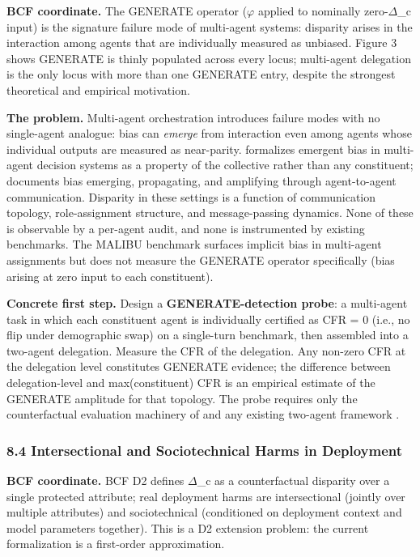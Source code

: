 \documentclass[10pt]{article}
\begin{document}
\textbf{BCF coordinate.} The GENERATE operator ($\varphi$ applied to nominally zero-$\Delta$\_c input) is the signature failure mode of multi-agent systems: disparity arises in the interaction among agents that are individually measured as unbiased. Figure 3 shows GENERATE is thinly populated across every locus; multi-agent delegation is the only locus with more than one GENERATE entry, despite the strongest theoretical and empirical motivation.

\textbf{The problem.} Multi-agent orchestration introduces failure modes with no single-agent analogue: bias can \emph{emerge} from interaction even among agents whose individual outputs are measured as near-parity. \cite{madigan2025emergent} formalizes emergent bias in multi-agent decision systems as a property of the collective rather than any constituent; \cite{nguyen2025social} documents bias emerging, propagating, and amplifying through agent-to-agent communication. Disparity in these settings is a function of communication topology, role-assignment structure, and message-passing dynamics. None of these is observable by a per-agent audit, and none is instrumented by existing benchmarks. The MALIBU benchmark \cite{mirza2025malibu} surfaces implicit bias in multi-agent assignments but does not measure the GENERATE operator specifically (bias arising at zero input to each constituent).

\textbf{Concrete first step.} Design a \textbf{GENERATE-detection probe}: a multi-agent task in which each constituent agent is individually certified as CFR = 0 (i.e., no flip under demographic swap) on a single-turn benchmark, then assembled into a two-agent delegation. Measure the CFR of the delegation. Any non-zero CFR at the delegation level constitutes GENERATE evidence; the difference between delegation-level and max(constituent) CFR is an empirical estimate of the GENERATE amplitude for that topology. The probe requires only the counterfactual evaluation machinery of \cite{mayilvaghanan2026counterfactual} and any existing two-agent framework \cite{wu2023autogen}.

\subsubsection*{8.4 Intersectional and Sociotechnical Harms in Deployment}

\textbf{BCF coordinate.} BCF D2 defines $\Delta$\_c as a counterfactual disparity over a single protected attribute; real deployment harms are intersectional (jointly over multiple attributes) and sociotechnical (conditioned on deployment context and model parameters together). This is a D2 extension problem: the current formalization is a first-order approximation.
\end{document}
